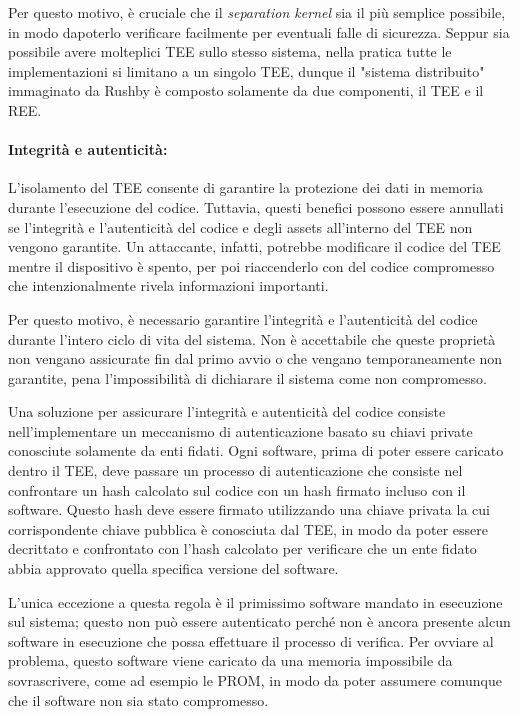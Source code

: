\documentclass[12pt,italian]{report}
\begin{document}
Per questo motivo, è cruciale che il \textit{separation kernel} sia
il più semplice possibile, in modo dapoterlo verificare facilmente per
eventuali falle di sicurezza.
Seppur sia possibile avere molteplici TEE sullo stesso sistema, nella pratica
tutte le implementazioni si limitano a un singolo TEE, dunque il
"sistema distribuito" immaginato da Rushby è composto solamente da due
componenti, il TEE e il REE.

\paragraph{Integrità e autenticità:}
L'isolamento del TEE consente di garantire la protezione dei dati
in memoria durante l'esecuzione del codice.
Tuttavia, questi benefici possono essere annullati se l'integrità e
l'autenticità del codice e degli assets all'interno del TEE non vengono
garantite.
Un attaccante, infatti, potrebbe modificare il codice del TEE mentre il
dispositivo è spento, per poi riaccenderlo con del codice compromesso
che intenzionalmente rivela informazioni importanti.

Per questo motivo, è necessario garantire l'integrità e l'autenticità del
codice durante l'intero ciclo di vita del sistema.
Non è accettabile che queste proprietà non vengano assicurate fin dal primo
avvio o che vengano temporaneamente non garantite, pena l'impossibilità di
dichiarare il sistema come non compromesso.

Una soluzione per assicurare l'integrità e autenticità del codice consiste
nell'implementare un meccanismo di autenticazione basato su chiavi
private conosciute solamente da enti fidati.
Ogni software, prima di poter essere caricato dentro il TEE, deve
passare un processo di autenticazione che consiste nel confrontare un hash
calcolato sul codice con un hash firmato incluso con il software.
Questo hash deve essere firmato utilizzando una chiave privata la cui
corrispondente chiave pubblica è conosciuta dal TEE, in modo da poter
essere decrittato e confrontato con l'hash calcolato per
verificare che un ente fidato abbia approvato quella specifica versione
del software. 

L'unica eccezione a questa regola è il primissimo software mandato
in esecuzione sul sistema; questo non può essere autenticato perché non
è ancora presente alcun software in esecuzione che possa effettuare il
processo di verifica.
Per ovviare al problema, questo software viene caricato da una memoria
impossibile da sovrascrivere, come ad esempio le PROM, in modo da
poter assumere comunque che il software non sia stato compromesso.
\end{document}
